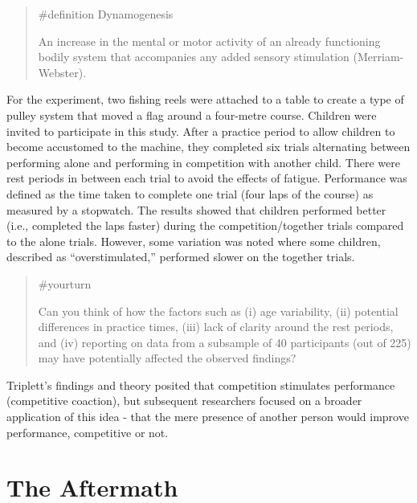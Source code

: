\documentclass[
  letterpaper,
]{book}
\begin{document}
\begin{quote}
\label{def-dynamogenesis}{\#definition} Dynamogenesis

An increase in the mental or motor activity of an already functioning
bodily system that accompanies any added sensory stimulation
(Merriam-Webster).
\end{quote}

For the experiment, two fishing reels were attached to a table to create
a type of pulley system that moved a flag around a four-metre course.
Children were invited to participate in this study. After a practice
period to allow children to become accustomed to the machine, they
completed six trials alternating between performing alone and performing
in competition with another child. There were rest periods in between
each trial to avoid the effects of fatigue. Performance was defined as
the time taken to complete one trial (four laps of the course) as
measured by a stopwatch. The results showed that children performed
better (i.e., completed the laps faster) during the competition/together
trials compared to the alone trials. However, some variation was noted
where some children, described as ``overstimulated,'' performed slower
on the together trials.

\begin{quote}
{\#yourturn}

Can you think of how the factors such as (i) age variability, (ii)
potential differences in practice times, (iii) lack of clarity around
the rest periods, and (iv) reporting on data from a subsample of 40
participants (out of 225) may have potentially affected the observed
findings?
\end{quote}

Triplett's findings and theory posited that competition stimulates
performance (competitive coaction), but subsequent researchers focused
on a broader application of this idea - that the mere presence of
another person would improve performance, competitive or not.

\section{The Aftermath}\label{the-aftermath-9}
\end{document}
